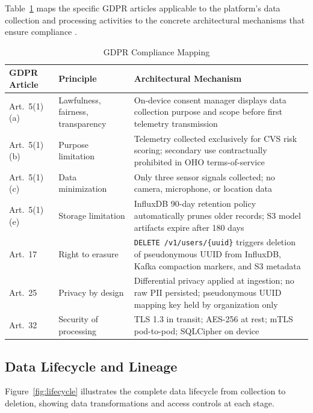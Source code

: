 \documentclass[conference]{IEEEtran}
\begin{document}
Table~\ref{tab:gdpr} maps the specific GDPR articles applicable to the platform's
data collection and processing activities to the concrete architectural mechanisms that
ensure compliance \cite{b12}.

\begin{table}[H]
  \centering
  \caption{GDPR Compliance Mapping}
  \label{tab:gdpr}
  \begin{tabularx}{\textwidth}{p{2cm} p{4cm} X}
    \toprule
    \textbf{GDPR Article} & \textbf{Principle} & \textbf{Architectural Mechanism} \\
    \midrule
    Art.\ 5(1)(a) & Lawfulness, fairness, transparency &
      On-device consent manager displays data collection purpose and scope before
      first telemetry transmission \\
    Art.\ 5(1)(b) & Purpose limitation &
      Telemetry collected exclusively for CVS risk scoring; secondary use
      contractually prohibited in OHO terms-of-service \\
    Art.\ 5(1)(c) & Data minimization &
      Only three sensor signals collected; no camera, microphone, or location data \\
    Art.\ 5(1)(e) & Storage limitation &
      InfluxDB 90-day retention policy automatically prunes older records; S3
      model artifacts expire after 180 days \\
    Art.\ 17 & Right to erasure &
      \texttt{DELETE /v1/users/\{uuid\}} triggers deletion of pseudonymous UUID
      from InfluxDB, Kafka compaction markers, and S3 metadata \\
    Art.\ 25 & Privacy by design &
      Differential privacy applied at ingestion; no raw PII persisted;
      pseudonymous UUID mapping key held by organization only \\
    Art.\ 32 & Security of processing &
      TLS 1.3 in transit; AES-256 at rest; mTLS pod-to-pod; SQLCipher on device \\
    \bottomrule
  \end{tabularx}
\end{table}

\subsection{Data Lifecycle and Lineage}

Figure~\ref{fig:lifecycle} illustrates the complete data lifecycle from collection
to deletion, showing data transformations and access controls at each stage.
\end{document}
